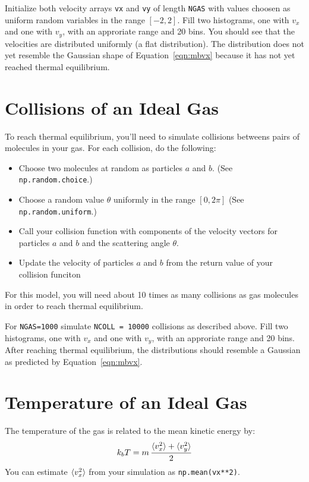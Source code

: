 \begin{plot} Initialize both velocity arrays {\tt vx} and {\tt vy} of length {\tt NGAS}
with values choosen as uniform random variables in the range
$[-2,2]$. Fill two histograms, one with $v_x$ and one with $v_y$, with
an approriate range and 20 bins.  You should see that the velocities
are distributed uniformly (a flat distribution).  The distribution does not yet
resemble the Gaussian shape of Equation~\ref{eqn:mbvx} because it has not yet reached
thermal equilibrium.\end{plot}


\section{Collisions of an Ideal Gas}

To reach thermal equilibrium, you'll need to simulate collisions
betweens pairs of molecules in your gas.  For each collision, do the following:
\begin{itemize}
 \item Choose two molecules at random as particles $a$ and $b$. (See {\tt np.random.choice}.)
 \item Choose a random value $\theta$ uniformly in the range $[0,2\pi]$ (See {\tt np.random.uniform}.)
 \item Call your collision function with components of the velocity vectors for particles $a$ and $b$ and the scattering angle $\theta$.
 \item Update the velocity of particles $a$ and $b$ from the return value of your collision funciton
\end{itemize}   
For this model, you will need about 10 times as many collisions as gas
molecules in order to reach thermal equilibrium.

\begin{plot}  For {\tt NGAS=1000} simulate {\tt NCOLL = 10000} collisions as described above.
Fill two histograms, one with $v_x$ and one with $v_y$, with an
approriate range and 20 bins.  After reaching thermal equilibrium, the
distributions should resemble a Gaussian as predicted by Equation~\ref{eqn:mbvx}. \end{plot}

\section{Temperature of an Ideal Gas}

The temperature of the gas is related to the mean kinetic energy by:
\begin{equation}
\label{eqn:kt}
k_b T = m \, \frac{\braket{v_x^2} + \braket{v_y^2}}{2}  
\end{equation}  
You can estimate $\braket{v_x^2}$ from your simulation as {\tt np.mean(vx**2)}.


